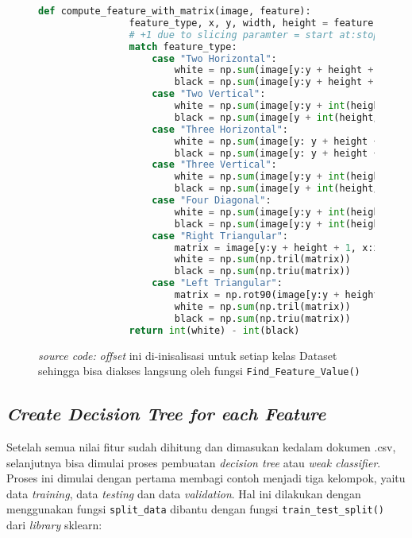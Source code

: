 	\begin{figure}[H]
		\begin{lstlisting}[language=Python, basicstyle=\tiny]
			def compute_feature_with_matrix(image, feature):
				feature_type, x, y, width, height = feature
				# +1 due to slicing paramter = start at:stop before
				match feature_type:
					case "Two Horizontal":
						white = np.sum(image[y:y + height + 1, x:x + int(width/2) + 1])
						black = np.sum(image[y:y + height + 1, x + int(width/2):x + width + 1])
					case "Two Vertical":
						white = np.sum(image[y:y + int(height/2) + 1, x:x + width+1])
						black = np.sum(image[y + int(height/2):y + height + 1, x:x + width+1])
					case "Three Horizontal":
						white = np.sum(image[y: y + height + 1, x:x + int(width/3) + 1]) + np.sum(image[y: y + height + 1, x + int(width*2/3):x + width + 1])
						black = np.sum(image[y: y + height + 1, x + int(width/3):x + int(width*2/3) + 1])
					case "Three Vertical":
						white = np.sum(image[y:y + int(height/3) + 1, x:x + width + 1]) + np.sum(image[y + int(height*2/3):y + height + 1, x: x + width + 1])
						black = np.sum(image[y + int(height/3):y + int(height*2/3) + 1, x:x + width + 1])
					case "Four Diagonal":
						white = np.sum(image[y:y + int(height/2) + 1, x + int(width/2): x + width + 1]) + np.sum(image[y + int(height/2):y + height + 1, x: x + int(width/2) + 1])
						black = np.sum(image[y:y + int(height/2) + 1, x:x + int(width/2) + 1]) + np.sum(image[y + int(height/2): y + height + 1, x + int(width/2):x + width + 1])
					case "Right Triangular":
						matrix = image[y:y + height + 1, x:x + width + 1]
						white = np.sum(np.tril(matrix))
						black = np.sum(np.triu(matrix))
					case "Left Triangular":
						matrix = np.rot90(image[y:y + height + 1, x:x + width + 1], k=3)
						white = np.sum(np.tril(matrix))
						black = np.sum(np.triu(matrix))
				return int(white) - int(black)
		\end{lstlisting}
		\caption{\emph{source code:} \textit{offset} ini di-inisalisasi untuk setiap kelas Dataset 
		sehingga bisa diakses langsung oleh fungsi \texttt{Find\_Feature\_Value()}}
		\label{code: feature calculation}
	\end{figure}

	\subsection{\textit{Create Decision Tree for each Feature}}
		Setelah semua nilai fitur sudah dihitung dan dimasukan kedalam dokumen .csv, 
		selanjutnya bisa dimulai proses pembuatan \emph{decision tree} atau \emph{weak classifier}. 
		Proses ini dimulai dengan pertama membagi contoh menjadi tiga kelompok, yaitu data \emph{training}, 
		data \emph{testing} dan data \emph{validation}. Hal ini dilakukan dengan menggunakan fungsi 
		\texttt{split\_data} dibantu dengan fungsi \texttt{train\_test\_split()} dari \textit{library} sklearn:

